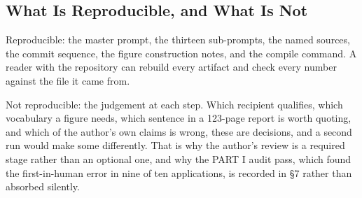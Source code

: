 \subsection{What Is Reproducible, and What Is Not}

Reproducible: the master prompt, the thirteen sub-prompts, the named sources,
the commit sequence, the figure construction notes, and the compile command. A
reader with the repository can rebuild every artifact and check every number
against the file it came from.

Not reproducible: the judgement at each step. Which recipient qualifies, which
vocabulary a figure needs, which sentence in a 123-page report is worth quoting,
and which of the author's own claims is wrong, these are decisions, and a second
run would make some differently. That is why the author's review is a required
stage rather than an optional one, and why the PART I audit pass, which found
the first-in-human error in nine of ten applications, is recorded in \S7 rather
than absorbed silently.
